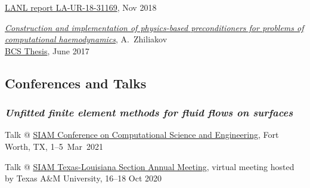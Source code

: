 \documentclass[a4paper,12pt]{article}
\begin{document}
\begin{etaremune}[topsep=0pt]
		\href{https://permalink.lanl.gov/object/tr?what=info:lanl-repo/lareport/LA-UR-18-31169}{LANL report LA-UR-18-31169}, Nov 2018 
		\item \textit{\href{https://www.researchgate.net/publication/318039077_Postroenie_i_realizacia_fiziceskih_pereobuslavlivatelej_dla_zadac_vycislitelnoj_gemodinamiki}{Construction and implementation of physics-based preconditioners for problems of computational haemodynamics}}, A.~Zhiliakov\\ \href{https://elibrary.nstu.ru/source?id=61216}{BCS Thesis}, June 2017   
%			
%			
	\end{etaremune}

	\subsection*{Conferences and Talks}
	
	\subsubsection*{\textit{Unfitted finite element methods for fluid flows on surfaces}}
	\begin{etaremune}[topsep=0pt]
		\item Talk @ \href{https://www.siam.org/conferences/cm/conference/cse21}{SIAM Conference on Computational Science and Engineering}, Fort Worth, TX, 1--5~Mar~2021
		\item Talk @ \href{https://www.math.tamu.edu/conferences/SIAMTXLA/}{SIAM Texas-Louisiana Section Annual Meeting}, virtual meeting
		hosted by Texas A\&M University, 16--18 Oct 2020
	\end{etaremune}
\end{document}
